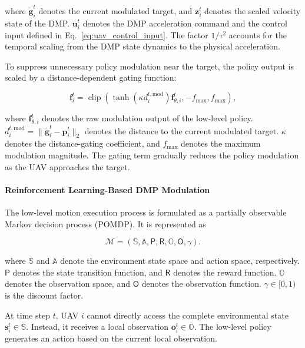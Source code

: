 \noindent
where $\widetilde{\mathbf g}_{i}^{t}$ denotes the current modulated target, and $\mathbf z_i^t$ denotes the scaled velocity state of the DMP. $\mathbf u_i^t$ denotes the DMP acceleration command and the control input defined in Eq.~\eqref{eq:uav_control_input}. The factor $1/\tau^2$ accounts for the temporal scaling from the DMP state dynamics to the physical acceleration.

To suppress unnecessary policy modulation near the target, the policy output is scaled by a distance-dependent gating function:

\begin{equation}
    \label{eq:dmp_gated_forcing}
    \mathbf f_i^t
    =
    \operatorname{clip}
    \left(
    \tanh\left(\kappa d_i^{t,\mathrm{mod}}\right)
    \mathbf f_{\theta,i}^t,
    -f_{\max},
    f_{\max}
    \right),
\end{equation}

\noindent
where $\mathbf f_{\theta,i}^t$ denotes the raw modulation output of the low-level policy. $d_i^{t,\mathrm{mod}}=\|\widetilde{\mathbf g}_i^t-\mathbf p_i^t\|_2$ denotes the distance to the current modulated target. $\kappa$ denotes the distance-gating coefficient, and $f_{\max}$ denotes the maximum modulation magnitude. The gating term gradually reduces the policy modulation as the UAV approaches the target.

\paragraph{Reinforcement Learning-Based DMP Modulation}

The low-level motion execution process is formulated as a partially observable Markov decision process (POMDP). It is represented as

\begin{equation}
    \label{eq:pomdp_formulation}
    \mathcal{M}
    =
    \left(
    \mathbb{S},
    \mathbb{A},
    \mathsf{P},
    \mathsf{R},
    \mathbb{O},
    \mathsf{O},
    \gamma
    \right).
\end{equation}

\noindent
where $\mathbb{S}$ and $\mathbb{A}$ denote the environment state space and action space, respectively. $\mathsf{P}$ denotes the state transition function, and $\mathsf{R}$ denotes the reward function. $\mathbb{O}$ denotes the observation space, and $\mathsf{O}$ denotes the observation function. $\gamma\in[0,1)$ is the discount factor.

At time step $t$, UAV $i$ cannot directly access the complete environmental state $\mathbf{s}_i^t\in\mathbb{S}$. Instead, it receives a local observation $\mathbf{o}_i^t\in\mathbb{O}$. The low-level policy generates an action based on the current local observation.

